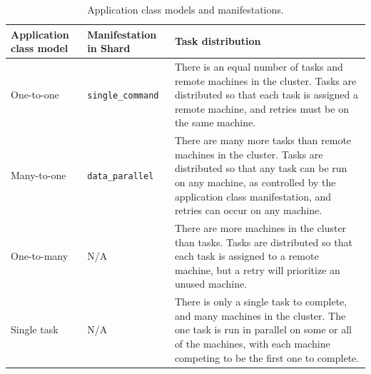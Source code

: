 \documentclass[oneside]{report}
\begin{document}
\begin{table}[h]
  \begin{center}
    \begin{tabularx}{\textwidth}{|l|l|X|}
      \hline
      Application class model & Manifestation in Shard   & Task distribution
      \\ \hline
      One-to-one              & \texttt{single\_command} & There is an equal number of tasks and remote machines in the cluster. Tasks are distributed so that each task is assigned a remote machine, and retries must be on the same machine.
      \\ \hline
      Many-to-one             & \texttt{data\_parallel}  & There are many more tasks than remote machines in the cluster. Tasks are distributed so that any task can be run on any machine, as controlled by the application class manifestation, and retries can occur on any machine.
      \\ \hline
      One-to-many             & N/A                      & There are more machines in the cluster than tasks.
      Tasks are distributed so that each task is assigned to a remote machine, but a retry will prioritize an unused machine.
      \\ \hline
      Single task             & N/A                      & There is only a single task to complete, and many machines in the cluster. The one task is run in parallel on some or all of the machines, with each machine competing to be the first one to complete.
      \\ \hline
    \end{tabularx}
    \caption{Application class models and manifestations.}
    \label{fig:application_class_models}
  \end{center}
\end{table}
\end{document}
